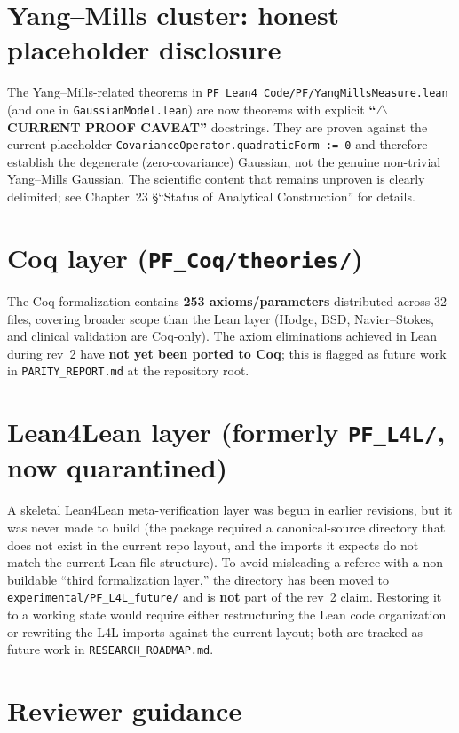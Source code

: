 \section*{Yang--Mills cluster: honest placeholder disclosure}

The Yang--Mills-related theorems in \texttt{PF\_Lean4\_Code/PF/YangMillsMeasure.lean}
(and one in \texttt{GaussianModel.lean}) are now theorems with explicit
\textbf{``\(\triangle\) CURRENT PROOF CAVEAT''} docstrings. They are proven against
the current placeholder \texttt{CovarianceOperator.quadraticForm~:=~0} and therefore
establish the degenerate (zero-covariance) Gaussian, not the genuine non-trivial
Yang--Mills Gaussian. The scientific content that remains unproven is clearly
delimited; see Chapter~23 \S``Status of Analytical Construction'' for details.

\section*{Coq layer (\texttt{PF\_Coq/theories/})}

The Coq formalization contains \textbf{253 axioms/parameters} distributed across
32 files, covering broader scope than the Lean layer (Hodge, BSD, Navier--Stokes,
and clinical validation are Coq-only). The axiom eliminations achieved in Lean
during rev~2 have \textbf{not yet been ported to Coq}; this is flagged as future
work in \texttt{PARITY\_REPORT.md} at the repository root.

\section*{Lean4Lean layer (formerly \texttt{PF\_L4L/}, now quarantined)}

A skeletal Lean4Lean meta-verification layer was begun in earlier
revisions, but it was never made to build (the package required a
canonical-source directory that does not exist in the current repo
layout, and the imports it expects do not match the current Lean
file structure). To avoid misleading a referee with a non-buildable
``third formalization layer,'' the directory has been moved to
\texttt{experimental/PF\_L4L\_future/} and is \textbf{not} part of
the rev~2 claim. Restoring it to a working state would require
either restructuring the Lean code organization or rewriting the
L4L imports against the current layout; both are tracked as future
work in \texttt{RESEARCH\_ROADMAP.md}.

\section*{Reviewer guidance}

